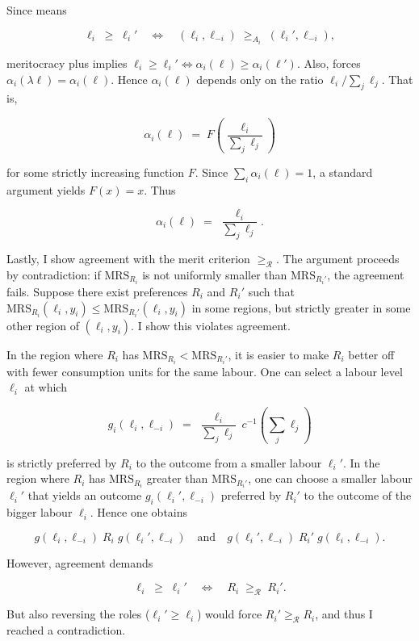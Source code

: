 \begin{propproof}
	Since  means

	\[
		\ell_i\;\ge\;\ell_i'
		\quad\Longleftrightarrow\quad
		(\ell_i,\ell_{-i}) \;\ge_{A_i}\; (\ell_i',\ell_{-i}),
	\]

	meritocracy plus  implies \(\ell_i\ge\ell_i'\iff\alpha_i(\ell)\ge\alpha_i(\ell')\). Also,  forces \(\alpha_i(\lambda\ell)=\alpha_i(\ell)\). Hence \(\alpha_i(\ell)\) depends only on the ratio \(\ell_i/\sum_j\ell_j\). That is,

	\[
		\alpha_i(\ell)
		\;=\;
		F \left( \frac{\ell_i}{\sum_j \ell_j} \right)
	\]

	for some strictly increasing function \(F\). Since \(\sum_i \alpha_i(\ell)=1\), a standard argument \citep[ch. 2 Th. 2]{aczelLecturesFunctionalEquations1966} yields \(F(x)=x\). Thus

	\[
		\alpha_i(\ell)
		\;=\;
		\frac{\ell_i}{\sum_j\ell_j}.
	\]

	Lastly, I show agreement with the merit criterion \( \geq_{\mathcal{R}} \). The argument proceeds by contradiction: if \(\mathrm{MRS}_{R_i}\) is not uniformly smaller than \(\mathrm{MRS}_{R_i'}\), the agreement fails. Suppose there exist preferences \(R_i\) and \(R_i'\) such that \(\mathrm{MRS}_{R_i}(\ell_i,y_i)\le \mathrm{MRS}_{R_i'}(\ell_i,y_i)\) in some regions, but strictly greater in some other region of \((\ell_i,y_i)\). I show this violates agreement.

	In the region where \(R_i\) has \(\mathrm{MRS}_{R_i} < \mathrm{MRS}_{R_i'}\), it is easier to make \(R_i\) better off with fewer consumption units for the same labour.  One can select a labour level \(\ell_i\) at which

	\[
		g_i(\ell_i,\ell_{-i})
		\;=\;
		\frac{\ell_i}{\sum_j\ell_j}\,c^{-1} \left( \sum_j\ell_j \right)
	\]

	is strictly preferred by \(R_i\) to the outcome from a smaller labour \(\ell_i'\). In the region where \(R_i\) has \(\mathrm{MRS}_{R_i}\) greater than \(\mathrm{MRS}_{R_i'}\), one can choose a smaller labour \(\ell_i'\) that yields an outcome \(g_i(\ell_i',\ell_{-i})\) preferred by \(R_i'\) to the outcome of the bigger labour \(\ell_i\). Hence one obtains

	\[
		g(\ell_i,\ell_{-i})
		\; R_i\;
		g(\ell_i',\ell_{-i})
		\quad\text{and}\quad
		g(\ell_i',\ell_{-i})
		\; R_i'\;
		g(\ell_i,\ell_{-i}) .
	\]

	However, agreement demands

	\[
		\ell_i \;\ge\;\ell_i'
		\quad\Longleftrightarrow\quad
		R_i \;\ge_\mathcal{R}\; R_i'.
	\]

	But also reversing the roles (\(\ell_i'\ge \ell_i\)) would force
	\(R_i'\ge_\mathcal{R} R_i\), and thus I reached a contradiction.

\end{propproof}

